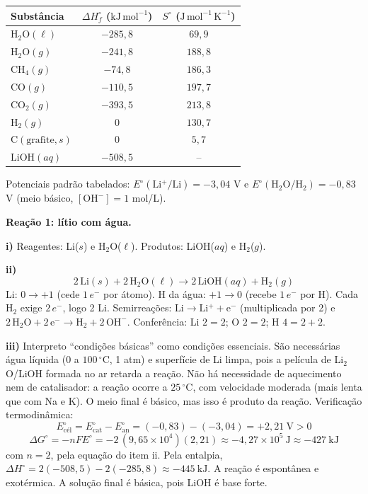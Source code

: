 \documentclass{article}%
\begin{document}
\begin{center}
\begin{tabular}{lcc}
Substância & $\Delta H_f^\circ$ ($\mathrm{kJ\,mol^{-1}}$) & $S^\circ$ ($\mathrm{J\,mol^{-1}\,K^{-1}}$) \\
\hline
$\mathrm{H_2O}(\ell)$ & $-285{,}8$ & $69{,}9$ \\
$\mathrm{H_2O}(g)$ & $-241{,}8$ & $188{,}8$ \\
$\mathrm{CH_4}(g)$ & $-74{,}8$ & $186{,}3$ \\
$\mathrm{CO}(g)$ & $-110{,}5$ & $197{,}7$ \\
$\mathrm{CO_2}(g)$ & $-393{,}5$ & $213{,}8$ \\
$\mathrm{H_2}(g)$ & $0$ & $130{,}7$ \\
$\mathrm{C}(\text{grafite}, s)$ & $0$ & $5{,}7$ \\
$\mathrm{LiOH}(aq)$ & $-508{,}5$ & -- \\
\end{tabular}
\end{center}

Potenciais padrão tabelados: $E^\circ(\mathrm{Li^+/Li}) = -3{,}04$ V e $E^\circ(\mathrm{H_2O/H_2}) = -0{,}83$ V (meio básico, $[\mathrm{OH^-}] = 1$ mol/L).

\textbf{Reação 1: lítio com água.}

\textbf{i)} Reagentes: Li($s$) e H$_2$O($\ell$). Produtos: LiOH($aq$) e H$_2$($g$).

\textbf{ii)}
\[ 2\,\mathrm{Li}(s) + 2\,\mathrm{H_2O}(\ell) \rightarrow 2\,\mathrm{LiOH}(aq) + \mathrm{H_2}(g) \]
Li: $0 \rightarrow +1$ (cede $1\,e^-$ por átomo). H da água: $+1 \rightarrow 0$ (recebe $1\,e^-$ por H). Cada H$_2$ exige $2\,e^-$, logo 2 Li. Semirreações: $\mathrm{Li \rightarrow Li^+ + e^-}$ (multiplicada por 2) e $\mathrm{2\,H_2O + 2\,e^- \rightarrow H_2 + 2\,OH^-}$. Conferência: Li $2=2$; O $2=2$; H $4=2+2$.

\textbf{iii)} Interpreto ``condições básicas'' como condições essenciais. São necessárias água líquida (0 a $100\,^\circ$C, 1 atm) e superfície de Li limpa, pois a película de Li$_2$O/LiOH formada no ar retarda a reação. Não há necessidade de aquecimento nem de catalisador: a reação ocorre a $25\,^\circ$C, com velocidade moderada (mais lenta que com Na e K). O meio final é básico, mas isso é produto da reação. Verificação termodinâmica:
\[ E^\circ_{\text{cél}} = E^\circ_{\text{cat}} - E^\circ_{\text{an}} = (-0{,}83) - (-3{,}04) = +2{,}21\ \mathrm{V} > 0 \]
\[ \Delta G^\circ = -nFE^\circ = -2\,(9{,}65\times 10^4)(2{,}21) \approx -4{,}27\times 10^5\ \mathrm{J} \approx -427\ \mathrm{kJ} \]
com $n = 2$, pela equação do item ii. Pela entalpia, $\Delta H^\circ = 2(-508{,}5) - 2(-285{,}8) \approx -445\ \mathrm{kJ}$. A reação é espontânea e exotérmica. A solução final é básica, pois LiOH é base forte.
\end{document}
